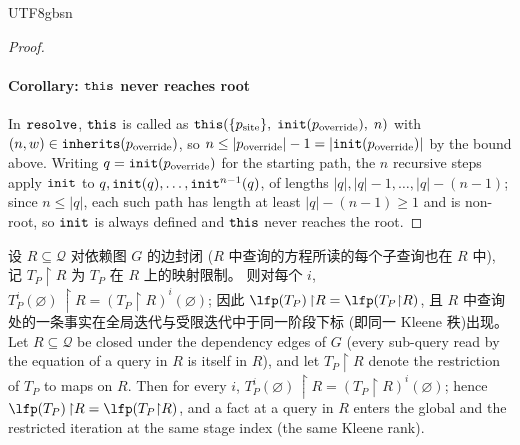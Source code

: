 \begin{CJK*}{UTF8}{gbsn}
\begin{proof}
  \paragraph{Corollary: $\mathtt{this}$ never reaches root}
  In $\mathtt{resolve}$, $\mathtt{this}$ is called as
  $\mathtt{this}(\{p_{\mathrm{site}}\},\; \mathtt{init}(p_{\mathrm{override}}),\; n)$
  with $(n, w) \in \mathtt{inherits}(p_{\mathrm{override}})$, so
  $n \leq |p_{\mathrm{override}}| - 1 = |\mathtt{init}(p_{\mathrm{override}})|$
  by the bound above. Writing $q = \mathtt{init}(p_{\mathrm{override}})$ for the
  starting path, the $n$ recursive steps apply $\mathtt{init}$ to
  $q, \mathtt{init}(q), \ldots, \mathtt{init}^{n-1}(q)$, of lengths
  $|q|, |q| - 1, \ldots, |q| - (n - 1)$; since $n \leq |q|$, each such
  path has length at least $|q| - (n - 1) \geq 1$ and is non-root, so
  $\mathtt{init}$ is always defined and $\mathtt{this}$ never reaches the root.
  \fi
\end{proof}

\begin{lemma}\label{lem:dependency-restriction}
  \ifPaperChinese
  设 $R \subseteq \mathcal{Q}$ 对依赖图 $G$ 的边封闭
  ($R$ 中查询的方程所读的每个子查询也在 $R$ 中),
  记 $T_P{\restriction}R$ 为 $T_P$ 在 $R$ 上的映射限制。
  则对每个 $i$,
  $T_P^i(\varnothing)\,{\restriction}R = (T_P{\restriction}R)^i(\varnothing)$;
  因此 $\lfp(T_P)\,{\restriction}R = \lfp(T_P{\restriction}R)$,
  且 $R$ 中查询处的一条事实在全局迭代与受限迭代中于同一阶段下标
  (即同一 Kleene 秩)出现。
  \else
  Let $R \subseteq \mathcal{Q}$ be closed under the dependency edges
  of $G$ (every sub-query read by the equation of a query in $R$ is
  itself in $R$), and let $T_P{\restriction}R$ denote the restriction
  of $T_P$ to maps on $R$. Then for every $i$,
  $T_P^i(\varnothing)\,{\restriction}R = (T_P{\restriction}R)^i(\varnothing)$;
  hence $\lfp(T_P)\,{\restriction}R = \lfp(T_P{\restriction}R)$, and a
  fact at a query in $R$ enters the global and the restricted
  iteration at the same stage index (the same Kleene rank).
  \fi
\end{lemma}


\end{CJK*}
